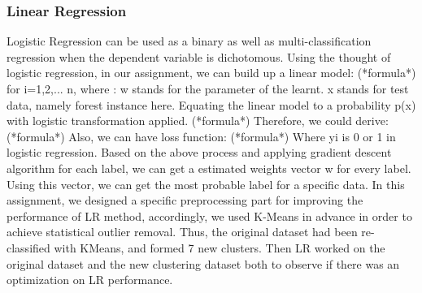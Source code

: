 \documentclass[12pt]{report}
\begin{document}
\subsubsection*{Linear Regression}
Logistic Regression can be used as a binary as well as multi-classification regression when the dependent variable is dichotomous. Using the thought of logistic regression, in our assignment, we can build up a linear model:
\newline (*formula*)
\newline for i=1,2,... n, where :
\newline w stands for the parameter of the learnt.
\newline x stands for test data, namely forest instance here. 
\newline  
\newline 
Equating the linear model to a probability p(x) with logistic transformation applied. 
\newline (*formula*)
\newline Therefore, we could derive: 
\newline (*formula*)
\newline Also, we can have loss function:
\newline (*formula*)
\newline Where yi is 0 or 1 in logistic regression. 
\newline
\newline
Based on the above process and applying gradient descent algorithm for each label, we can get a estimated weights vector w for every label. Using this vector, we can get the most probable label for a specific data. 
\newline
\newline
In this assignment, we designed a specific preprocessing part for improving the performance of LR method, accordingly, we used K-Means in advance in order to achieve statistical outlier removal. Thus, the original dataset had been re-classified with KMeans, and formed 7 new clusters. Then LR worked on the original dataset and the new clustering dataset both to observe if there was an optimization on LR performance.
\end{document}
